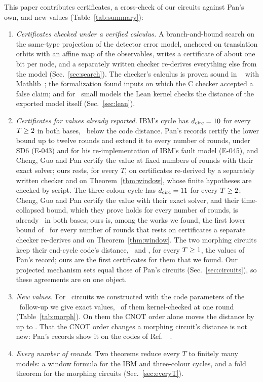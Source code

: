 \documentclass[aps,pra,twocolumn,superscriptaddress,nofootinbib,longbibliography,floatfix]{revtex4-2}
\newcommand{\dc}{d_{\mathrm{circ}}}
\begin{document}
This paper contributes certificates, a cross-check of our circuits against Pan's own, and new values (Table~\ref{tab:summary}):
\begin{enumerate}
\item \emph{Certificates checked under a verified calculus.} A branch-and-bound search on the same-type projection of the detector error model, anchored on translation orbits with an affine map of the observables, writes a certificate of about one bit per node, and a separately written checker re-derives everything else from the model (Sec.~\ref{sec:search}). The checker's calculus is proven sound in \LeanName~\cite{demoura2021lean4} with Mathlib~\cite{mathlib2020}; the formalization found inputs on which the C checker accepted a false claim; and for \LeanKernel\ small models the Lean kernel checks the distance of the exported model itself (Sec.~\ref{sec:lean}).
\item \emph{Certificates for values already reported.} IBM's cycle has $\dc=\IbmD$ for every $T\ge2$ in both bases, \IbmLoss\ below the code distance. Pan's records certify the lower bound up to twelve rounds and extend it to every number of rounds, under SD6 (E-043) and for his re-implementation of IBM's fault model (E-045), and Cheng, Guo and Pan certify the value at fixed numbers of rounds with their exact solver; ours rests, for every $T$, on certificates re-derived by a separately written checker and on Theorem~\ref{thm:window}, whose finite hypotheses are checked by script. The three-colour cycle has $\dc=\TcD$ for every $T\ge2$; Cheng, Guo and Pan certify the value with their exact solver, and their time-collapsed bound, which they prove holds for every number of rounds, is already \TcD\ in both bases; ours is, among the works we found, the first lower bound of \TcD\ for every number of rounds that rests on certificates a separate checker re-derives and on Theorem~\ref{thm:window}. The two morphing circuits keep their end-cycle code's distance, \MorphSmallD\ and \MorphBigD, for every $T\ge1$, the values of Pan's record; ours are the first certificates for them that we found. Our projected mechanism sets equal those of Pan's circuits (Sec.~\ref{sec:circuits}), so these agreements are on one object.
\item \emph{New values.} For \MtwoTargets\ circuits we constructed with the code parameters of the \STbYear\ follow-up we give exact values, \LeanKernel\ of them kernel-checked at one round (Table~\ref{tab:morph}). On them the CNOT order alone moves the distance by up to \MtwoOrderMax. That the CNOT order changes a morphing circuit's distance is not new: Pan's records show it on the codes of Ref.~\cite{shaw2024lowering}~\cite{pan2026e019}.
\item \emph{Every number of rounds.} Two theorems reduce every $T$ to finitely many models: a window formula for the IBM and three-colour cycles, and a fold theorem for the morphing circuits (Sec.~\ref{sec:everyT}).
\end{enumerate}
\end{document}
